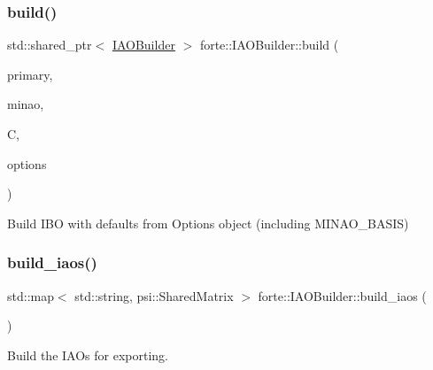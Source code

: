\subsubsection{\texorpdfstring{build()}{build()}}
{\footnotesize\ttfamily std\+::shared\+\_\+ptr$<$ \mbox{\hyperlink{classforte_1_1_i_a_o_builder}{I\+A\+O\+Builder}} $>$ forte\+::\+I\+A\+O\+Builder\+::build (\begin{DoxyParamCaption}\item[{std\+::shared\+\_\+ptr$<$ psi\+::\+Basis\+Set $>$}]{primary,  }\item[{std\+::shared\+\_\+ptr$<$ psi\+::\+Basis\+Set $>$}]{minao,  }\item[{std\+::shared\+\_\+ptr$<$ psi\+::\+Matrix $>$}]{C,  }\item[{std\+::shared\+\_\+ptr$<$ \mbox{\hyperlink{classforte_1_1_forte_options}{Forte\+Options}} $>$}]{options }\end{DoxyParamCaption})\hspace{0.3cm}{\ttfamily [static]}}



Build I\+BO with defaults from Options object (including M\+I\+N\+A\+O\+\_\+\+B\+A\+S\+IS) 

\mbox{\label{classforte_1_1_i_a_o_builder_a61476a3df5a98e9344df6dc50d44f7be}} 
\subsubsection{\texorpdfstring{build\+\_\+iaos()}{build\_iaos()}}
{\footnotesize\ttfamily std\+::map$<$ std\+::string, psi\+::\+Shared\+Matrix $>$ forte\+::\+I\+A\+O\+Builder\+::build\+\_\+iaos (\begin{DoxyParamCaption}{ }\end{DoxyParamCaption})}



Build the I\+A\+Os for exporting. 

\mbox{\label{classforte_1_1_i_a_o_builder_aa162eef954857bb49653ef276b99c003}} 
